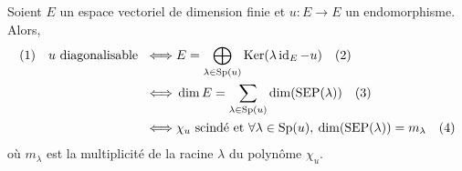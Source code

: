 \begin{thm}
	Soient $E$\/ un espace vectoriel de dimension finie et $u : E \to E$\/ un endomorphisme.
	Alors,
	\begin{align*}
		(1)\quad u \text{ diagonalisable } \iff& E = \bigoplus_{\lambda \in \operatorname{Sp}(u)} \operatorname{Ker}(\lambda\operatorname{id}_E - u) \quad(2)\\
		\iff& \dim E = \sum_{\lambda \in \operatorname{Sp}(u)} \dim(\mathrm{SEP}(\lambda))\quad(3)\\
		\iff& \chi_u \text{ scindé et } \forall \lambda \in \operatorname{Sp}(u),\:\dim(\mathrm{SEP}(\lambda)) = m_\lambda\quad(4)
	\end{align*}
	où $m_\lambda$\/ est la multiplicité de la racine $\lambda$\/ du polynôme $\chi_u$.
\end{thm}

